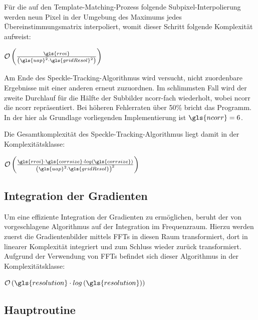 Für die auf den Template-Matching-Prozess folgende Subpixel-Interpolierung werden neun Pixel in der Umgebung des Maximums jedes Übereinstimmungsmatrix interpoliert, womit dieser Schritt folgende Komplexität aufweist:

\begin{center}
	$\mathcal{O}\left(\frac{\gls{rroi}}{\left(\gls{uap}^2 \cdot \gls{gridResol}^2\right)}\right)$
\end{center}

Am Ende des Speckle-Tracking-Algorithmus wird versucht, nicht zuordenbare Ergebnisse mit einer anderen   erneut zuzuordnen. Im schlimmsten Fall wird der zweite Durchlauf für die Hälfte der Subbilder \gls{ncorr}-fach wiederholt, wobei \gls{ncorr} die \glsdesc{ncorr} repräsentiert. Bei höheren Fehlerraten über 50\% bricht das Programm. In der hier als Grundlage vorliegenden Implementierung ist $\gls{ncorr} = 6$.

Die Gesamtkomplexität des Speckle-Tracking-Algorithmus liegt damit in der Komplexitätsklasse:

\begin{center}
	$\mathcal{O}\left(\frac{\gls{rroi} \cdot \gls{corrsize} \cdot log\left(\gls{corrsize}\right)}{\left(\gls{uap}^2 \cdot \gls{gridResol}\right)^2}\right)$
\end{center}

\subsection{Integration der Gradienten}

Um eine effiziente Integration der Gradienten zu ermöglichen, beruht der von \citeauthor{FC88} vorgeschlagene Algorithmus auf der Integration im Frequenzraum. Hierzu werden zuerst die Gradientenbilder mittels \glspl{FFT} in diesen Raum transformiert, dort in linearer Komplexität integriert und zum Schluss wieder zurück transformiert. 
Aufgrund der Verwendung von \glspl{FFT} befindet sich dieser Algorithmus in der Komplexitätsklasse:

\begin{center}
	$\mathcal{O}\left(\gls{resolution} \cdot log\left(\gls{resolution}\right)\right)$
\end{center}

\subsection{Hauptroutine}

